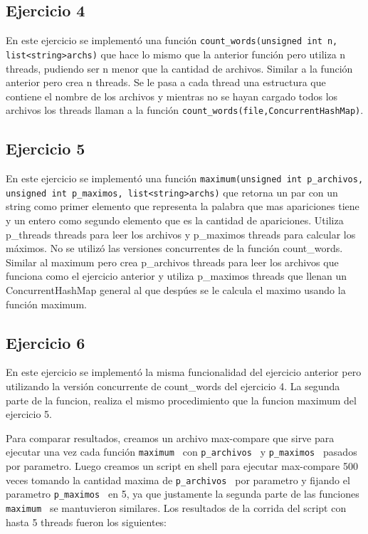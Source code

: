 \documentclass[a4paper]{article}
\begin{document}
{\subsection{Ejercicio 4}
En este ejercicio se implementó una función {\tt count_words(unsigned int n, list<string>archs)} que hace lo mismo que la anterior función pero utiliza n threads, pudiendo ser n menor que la cantidad de archivos. Similar a la función anterior pero crea n threads. Se le pasa a cada thread una estructura que contiene el nombre de los archivos y mientras no se hayan cargado todos los archivos los threads llaman a la función {\tt count_words(file,ConcurrentHashMap)}.

\subsection{Ejercicio 5}
En este ejercicio se implementó una función {\tt maximum(unsigned int p_archivos, unsigned int p_maximos, list<string>archs)} que retorna un par con un string como primer elemento que representa la palabra que mas apariciones tiene y un entero como segundo elemento que es la cantidad de apariciones. Utiliza p_threads threads para leer los archivos y p_maximos threads para calcular los máximos. No se utilizó las versiones concurrentes de la función count_words. Similar al maximum pero crea p_archivos threads para leer los archivos que funciona como el ejercicio anterior y utiliza p_maximos threads que llenan un ConcurrentHashMap general al que despúes se le calcula el maximo usando la función maximum.


\subsection{Ejercicio 6}

En este ejercicio se implementó la misma funcionalidad del ejercicio anterior pero utilizando la versión concurrente de count_words del ejercicio 4. La segunda parte de la funcion, realiza el mismo procedimiento que la funcion maximum del ejercicio 5.

Para comparar resultados, creamos un archivo max-compare que sirve para ejecutar una vez cada función {\tt maximum } con {\tt p_archivos } y {\tt p_maximos } pasados por parametro. Luego creamos un script en shell para ejecutar max-compare 500 veces tomando la cantidad maxima de {\tt p_archivos } por parametro y fijando el parametro {\tt p_maximos } en 5, ya que justamente la segunda parte de las funciones {\tt maximum } se mantuvieron similares. Los resultados de la corrida del script con hasta 5 threads fueron los siguientes:

}
\end{document}
